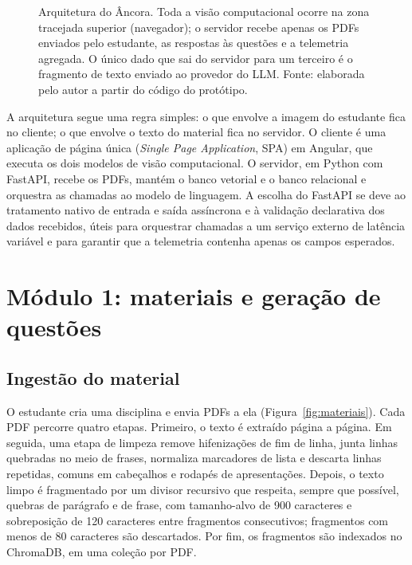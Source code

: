 \documentclass[portuguese,oneside]{tcc}
\newcommand{\ferramenta}{Âncora\xspace}
\newcommand{\estr}[1]{\emph{#1}}
\newcommand{\fs}{\emph{focusScore}\xspace}
\begin{document}
\begin{figure}[htbp]
\caption{Arquitetura do \ferramenta. Toda a visão computacional ocorre na zona tracejada superior (navegador); o servidor recebe apenas os PDFs enviados pelo estudante, as respostas às questões e a telemetria agregada. O único dado que sai do servidor para um terceiro é o fragmento de texto enviado ao provedor do LLM. Fonte: elaborada pelo autor a partir do código do protótipo.}
\label{fig:arquitetura}
\end{figure}

A arquitetura segue uma regra simples: o que envolve a imagem do estudante fica no cliente; o que envolve o texto do material fica no servidor. O cliente é uma aplicação de página única (\estr{Single Page Application}, SPA) em Angular, que executa os dois modelos de visão computacional. O servidor, em Python com FastAPI, recebe os PDFs, mantém o banco vetorial e o banco relacional e orquestra as chamadas ao modelo de linguagem. A escolha do FastAPI se deve ao tratamento nativo de entrada e saída assíncrona e à validação declarativa dos dados recebidos, úteis para orquestrar chamadas a um serviço externo de latência variável e para garantir que a telemetria contenha apenas os campos esperados.

\section{\label{sec:mod1}Módulo 1: materiais e geração de questões}

\subsection{Ingestão do material}

O estudante cria uma disciplina e envia PDFs a ela (Figura~\ref{fig:materiais}). Cada PDF percorre quatro etapas. Primeiro, o texto é extraído página a página. Em seguida, uma etapa de limpeza remove hifenizações de fim de linha, junta linhas quebradas no meio de frases, normaliza marcadores de lista e descarta linhas repetidas, comuns em cabeçalhos e rodapés de apresentações. Depois, o texto limpo é fragmentado por um divisor recursivo que respeita, sempre que possível, quebras de parágrafo e de frase, com tamanho-alvo de 900 caracteres e sobreposição de 120 caracteres entre fragmentos consecutivos; fragmentos com menos de 80 caracteres são descartados. Por fim, os fragmentos são indexados no ChromaDB, em uma coleção por PDF.
\end{document}
